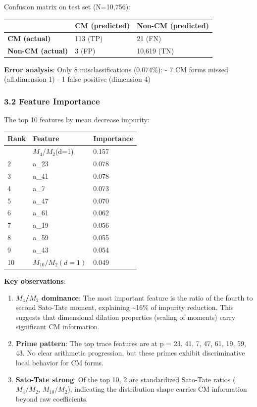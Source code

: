 \documentclass[
]{article}
\begin{document}
Confusion matrix on test set (N=10,756):

\begin{longtable}[]{@{}lll@{}}
\toprule\noalign{}
& CM (predicted) & Non-CM (predicted) \\
\midrule\noalign{}
\endhead
\bottomrule\noalign{}
\endlastfoot
\textbf{CM (actual)} & 113 (TP) & 21 (FN) \\
\textbf{Non-CM (actual)} & 3 (FP) & 10,619 (TN) \\
\end{longtable}

\textbf{Error analysis}: Only 8 misclassifications (0.074\%): - 7 CM
forms missed (all.dimension 1) - 1 false positive (dimension 4)

\hypertarget{feature-importance}{%
\subsubsection{3.2 Feature Importance}\label{feature-importance}}

The top 10 features by mean decrease impurity:

\begin{longtable}[]{@{}lll@{}}
\toprule\noalign{}
Rank & Feature & Importance \\
\midrule\noalign{}
\endhead
\bottomrule\noalign{}
\endlastfoot
1 & $M_4$/$M_2$(d=1) & 0.157 \\
2 & a\_23 & 0.078 \\
3 & a\_41 & 0.078 \\
4 & a\_7 & 0.073 \\
5 & a\_47 & 0.070 \\
6 & a\_61 & 0.062 \\
7 & a\_19 & 0.056 \\
8 & a\_59 & 0.055 \\
9 & a\_43 & 0.054 \\
10 & $M_10/M_2(d=1)$ & 0.049 \\
\end{longtable}

\textbf{Key observations}:

\begin{enumerate}
\def\labelenumi{\arabic{enumi}.}
\item
  \textbf{$M_4$/$M_2$ dominance}: The most important feature is the ratio of
  the fourth to second Sato-Tate moment, explaining \textasciitilde16\%
  of impurity reduction. This suggests that dimensional dilation
  properties (scaling of moments) carry significant CM information.
\item
  \textbf{Prime pattern}: The top trace features are at p = 23, 41, 7,
  47, 61, 19, 59, 43. No clear arithmetic progression, but these primes
  exhibit discriminative local behavior for CM forms.
\item
  \textbf{Sato-Tate strong}: Of the top 10, 2 are standardized Sato-Tate
  ratios ($M_4/M_2$, $M_10/M_2$), indicating the distribution shape carries CM
  information beyond raw coefficients.
\end{enumerate}
\end{document}
